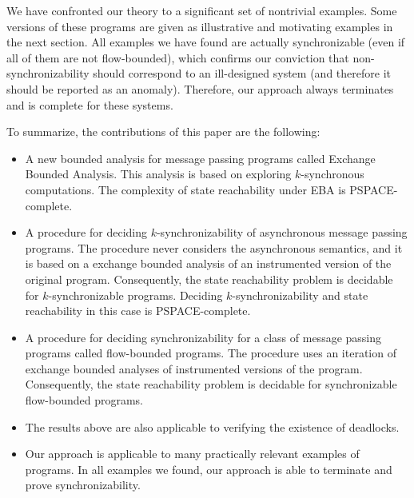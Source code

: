 We have confronted our theory to a significant set of nontrivial examples. Some versions of these programs are given as illustrative and motivating examples in the next section. 
All examples we have found are actually synchronizable (even if all of them are not flow-bounded), which confirms our conviction that non-synchronizability should correspond to an ill-designed system (and therefore it should be reported as an anomaly). Therefore, our approach always terminates and is complete for these systems.


 To summarize, the contributions of this paper are the following:

\begin{itemize}
\item A new bounded analysis for message passing programs called Exchange Bounded Analysis. This analysis is based on exploring $k$-synchronous computations. The complexity of state reachability under EBA is PSPACE-complete. 

\item A procedure for deciding $k$-synchronizability of asynchronous message passing programs. The procedure never considers the asynchronous semantics, and it is based on a exchange bounded analysis of an instrumented version of the original program. Consequently, the state reachability problem is decidable for $k$-synchronizable programs. Deciding  $k$-synchronizability and state reachability in this case is PSPACE-complete. 

\item A procedure for deciding synchronizability for a class of message passing programs called flow-bounded programs. The procedure  uses an iteration of exchange bounded analyses of instrumented versions of the program. Consequently, the state reachability problem is decidable for synchronizable flow-bounded programs. 

\item The results above are also applicable to verifying the existence of deadlocks. 

\item Our approach is applicable to many practically relevant examples of programs. In all examples we found, our approach is able to terminate and prove synchronizability.

\end{itemize}
